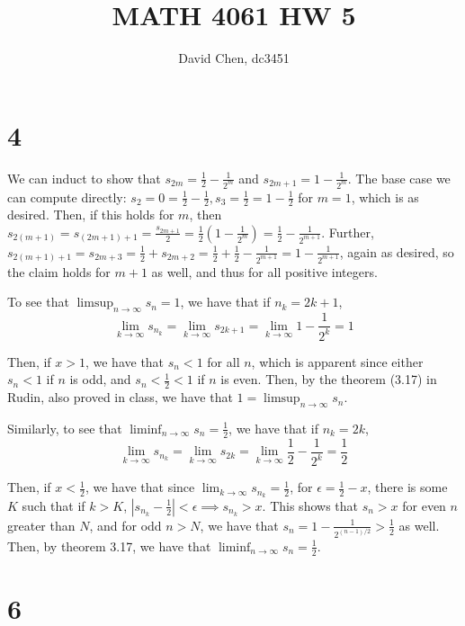 \documentclass[12pt,letterpaper]{article}
\title{MATH 4061 HW 5}
\author{David Chen, dc3451}
\theoremstyle{definition}
\begin{document}
\maketitle

\section*{4}

We can induct to show that $s_{2m} = \frac{1}{2} - \frac{1}{2^{m}}$ and $s_{2m + 1} = 1 - \frac{1}{2^{m}}$. The base case we can compute directly: $s_{2} = 0 = \frac{1}{2} - \frac{1}{2}, s_{3} = \frac{1}{2} = 1 - \frac{1}{2}$ for $m = 1$, which is as desired. Then, if this holds for $m$, then $s_{2(m+1)} = s_{(2m + 1) + 1} = \frac{s_{2m + 1}}{2} = \frac{1}{2}\left(1 - \frac{1}{2^{m}}\right) = \frac{1}{2} - \frac{1}{2^{m+1}}$. Further, $s_{2(m+1) + 1} = s_{2m + 3} = \frac{1}{2} + s_{2m + 2} = \frac{1}{2} + \frac{1}{2} - \frac{1}{2^{m+1}} = 1 - \frac{1}{2^{m+1}}$, again as desired, so the claim holds for $m + 1$ as well, and thus for all positive integers.

To see that $\limsup_{n \rightarrow \infty} s_{n} = 1$, we have that if $n_{k} = 2k+1$,
\[
  \lim_{k \rightarrow \infty}s_{n_{k}} = \lim_{k \rightarrow \infty}s_{2k + 1} = \lim_{k \rightarrow \infty} 1 - \frac{1}{2^{k}} = 1
\]

Then, if $x > 1$, we have that $s_{n} < 1$ for all $n$, which is apparent since either $s_{n} < 1$ if $n$ is odd, and $s_{n} < \frac{1}{2} < 1$ if $n$ is even. Then, by the theorem (3.17) in Rudin, also proved in class, we have that $1 = \limsup_{n \rightarrow \infty} s_{n}$.

Similarly, to see that $\liminf_{n \rightarrow \infty} s_{n} = \frac{1}{2}$, we have that if $n_{k} = 2k$,
\[
  \lim_{k \rightarrow \infty}s_{n_{k}} = \lim_{k \rightarrow \infty}s_{2k} = \lim_{k \rightarrow \infty} \frac{1}{2} - \frac{1}{2^{k}} = \frac{1}{2}
\]

Then, if $x < \frac{1}{2}$, we have that since $\lim_{k \rightarrow \infty} s_{n_{k}} = \frac{1}{2}$, for $\epsilon = \frac{1}{2} - x$, there is some $K$ such that if $k > K$, $|s_{n_{k}} - \frac{1}{2}| < \epsilon \implies s_{n_{k}} > x$. This shows that $s_{n} > x$ for even $n$ greater than $N$, and for odd $n > N$, we have that $s_{n} = 1 - \frac{1}{2^{(n-1)/2}} > \frac{1}{2}$ as well. Then, by theorem 3.17, we have that $\liminf_{n \rightarrow \infty}s_{n} = \frac{1}{2}$.

\section*{6}
\end{document}
